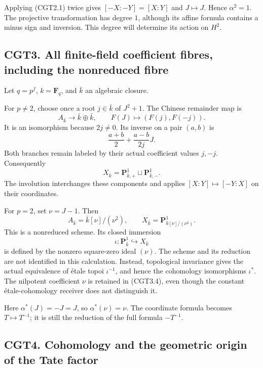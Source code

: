 Applying (CGT2.1) twice gives \([-X:-Y]=[X:Y]\) and \(J\mapsto J\).
Hence \(\alpha^2=1\). The projective transformation has degree \(1\),
although its affine formula contains a minus sign and inversion. This
degree will determine its action on \(H^2\).

\subsection{CGT3. All finite-field coefficient fibres, including the
nonreduced
fibre}\label{cgt3.-all-finite-field-coefficient-fibres-including-the-nonreduced-fibre}

Let \(q=p^f\), \(k=\mathbf F_q\), and \(\bar k\) an algebraic closure.

For \(p\ne2\), choose once a root \(j\in\bar k\) of \(J^2+1\). The
Chinese remainder map is \[
A_{\bar k}\longrightarrow\bar k\oplus\bar k,\qquad
F(J)\longmapsto(F(j),F(-j)).
\tag{CGT3.1}
\] It is an isomorphism because \(2j\ne0\). Its inverse on a pair
\((a,b)\) is \[
\frac{a+b}{2}+\frac{a-b}{2j}J.
\tag{CGT3.2}
\] Both branches remain labeled by their actual coefficient values
\(j,-j\). Consequently \[
X_{\bar k}=\mathbf P^1_{\bar k,+}\sqcup\mathbf P^1_{\bar k,-}.
\tag{CGT3.3}
\] The involution interchanges these components and applies
\([X:Y]\mapsto[-Y:X]\) on their coordinates.

For \(p=2\), set \(\nu=J-1\). Then \[
A_{\bar k}=\bar k[\nu]/(\nu^2),\qquad
X_{\bar k}=\mathbf P^1_{\bar k[\nu]/(\nu^2)}.
\tag{CGT3.4}
\] This is a nonreduced scheme. Its closed immersion \[
\iota:\mathbf P^1_{\bar k}\hookrightarrow X_{\bar k}
\tag{CGT3.5}
\] is defined by the nonzero square-zero ideal \((\nu)\). The scheme and
its reduction are not identified in this calculation. Instead,
topological invariance gives the actual equivalence of étale topoi
\(\iota^{-1}\), and hence the cohomology isomorphisms \(\iota^*\). The
nilpotent coefficient \(\nu\) is retained in (CGT3.4), even though the
constant étale-cohomology receiver does not distinguish it.

Here \(\alpha^*(J)=-J=J\), so \(\alpha^*(\nu)=\nu\). The coordinate
formula becomes \(T\mapsto T^{-1}\); it is still the reduction of the
full formula \(-T^{-1}\).

\subsection{CGT4. Cohomology and the geometric origin of the Tate
factor}\label{cgt4.-cohomology-and-the-geometric-origin-of-the-tate-factor}

